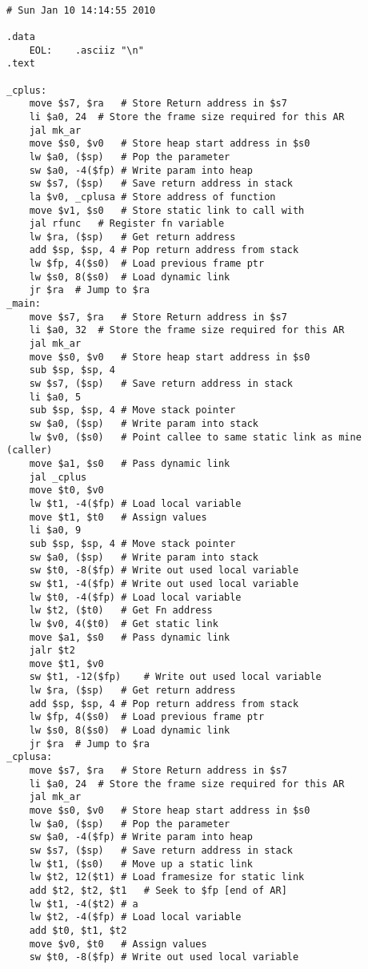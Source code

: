 \begin{lstlisting}[showstringspaces=false,breaklines=true,backgroundcolor=\color{light-gray}, captionpos=b]
         
# Sun Jan 10 14:14:55 2010

.data
	EOL:	.asciiz "\n"
.text

_cplus:
	move $s7, $ra	# Store Return address in $s7
	li $a0, 24	# Store the frame size required for this AR
	jal mk_ar
	move $s0, $v0	# Store heap start address in $s0
	lw $a0, ($sp)	# Pop the parameter
	sw $a0, -4($fp)	# Write param into heap
	sw $s7, ($sp)	# Save return address in stack
	la $v0, _cplusa	# Store address of function
	move $v1, $s0	# Store static link to call with
	jal rfunc	# Register fn variable
	lw $ra, ($sp)	# Get return address
	add $sp, $sp, 4	# Pop return address from stack
	lw $fp, 4($s0)	# Load previous frame ptr
	lw $s0, 8($s0)	# Load dynamic link
	jr $ra	# Jump to $ra
_main:
	move $s7, $ra	# Store Return address in $s7
	li $a0, 32	# Store the frame size required for this AR
	jal mk_ar
	move $s0, $v0	# Store heap start address in $s0
	sub $sp, $sp, 4
	sw $s7, ($sp)	# Save return address in stack
	li $a0, 5
	sub $sp, $sp, 4	# Move stack pointer
	sw $a0, ($sp)	# Write param into stack
	lw $v0, ($s0)	# Point callee to same static link as mine (caller)
	move $a1, $s0	# Pass dynamic link
	jal _cplus
	move $t0, $v0
	lw $t1, -4($fp)	# Load local variable
	move $t1, $t0	# Assign values
	li $a0, 9
	sub $sp, $sp, 4	# Move stack pointer
	sw $a0, ($sp)	# Write param into stack
	sw $t0, -8($fp)	# Write out used local variable
	sw $t1, -4($fp)	# Write out used local variable
	lw $t0, -4($fp)	# Load local variable
	lw $t2, ($t0)	# Get Fn address
	lw $v0, 4($t0)	# Get static link
	move $a1, $s0	# Pass dynamic link
	jalr $t2
	move $t1, $v0
	sw $t1, -12($fp)	# Write out used local variable
	lw $ra, ($sp)	# Get return address
	add $sp, $sp, 4	# Pop return address from stack
	lw $fp, 4($s0)	# Load previous frame ptr
	lw $s0, 8($s0)	# Load dynamic link
	jr $ra	# Jump to $ra
_cplusa:
	move $s7, $ra	# Store Return address in $s7
	li $a0, 24	# Store the frame size required for this AR
	jal mk_ar
	move $s0, $v0	# Store heap start address in $s0
	lw $a0, ($sp)	# Pop the parameter
	sw $a0, -4($fp)	# Write param into heap
	sw $s7, ($sp)	# Save return address in stack
	lw $t1, ($s0)	# Move up a static link
	lw $t2, 12($t1)	# Load framesize for static link
	add $t2, $t2, $t1	# Seek to $fp [end of AR]
	lw $t1, -4($t2)	# a
	lw $t2, -4($fp)	# Load local variable
	add $t0, $t1, $t2
	move $v0, $t0	# Assign values
	sw $t0, -8($fp)	# Write out used local variable

\end{lstlisting}
